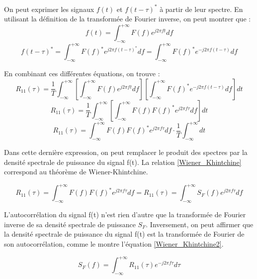 	On peut exprimer les signaux $f(t)$ et $f(t-\tau)^{*}$ à partir de leur spectre. En utilisant la définition de la transformée de Fourier inverse, on peut montrer que : 
	\begin{equation*}
	f(t)=\int_{-\infty}^{+\infty}F(f)e^{j2\pi ft}df
	\end{equation*}
	\begin{equation*}
	f(t-\tau)^{*}=\int_{-\infty}^{+\infty}F(f)^{*}e^{j2\pi f(t-\tau)^{*}}df=\int_{-\infty}^{+\infty}F(f)^{*}e^{-j2\pi f(t-\tau)}df
	\end{equation*}
	
	En combinant ces différentes équations, on trouve : 
	\begin{equation*}
	R_{11}(\tau)=\frac{1}{T}\int_{-\infty}^{+\infty}[\int_{-\infty}^{+\infty}F(f)e^{j2\pi ft}df][\int_{-\infty}^{+\infty}F(f)^{*}e^{-j2\pi f(t-\tau)}df]dt
	\end{equation*}
	\begin{equation*}
	R_{11}(\tau)=\frac{1}{T}\int_{-\infty}^{+\infty}[\int_{-\infty}^{+\infty}F(f)F(f)^{*}e^{j2\pi f\tau}df]dt
	\end{equation*}
	\begin{equation*}
	R_{11}(\tau)=\int_{-\infty}^{+\infty}F(f)F(f)^{*}e^{j2\pi f\tau}df \cdot \frac{1}{T}\int_{-\infty}^{+\infty}dt
	\end{equation*}
	
	Dans cette dernière expression, on peut remplacer le produit des spectres par la densité spectrale de puissance du signal f(t). La relation \ref{Wiener_Khintchine} correspond au théorème de Wiener-Khintchine.
	
	\begin{equation}\label{Wiener_Khintchine}
		R_{11}(\tau)=\int_{-\infty}^{+\infty}F(f)F(f)^{*}e^{j2\pi f\tau}df=	R_{11}(\tau)=\int_{-\infty}^{+\infty}S_{F}(f)e^{j2\pi f\tau}df
	\end{equation}
	
	L'autocorrélation du signal f(t) n'est rien d'autre que la transformée de Fourier inverse de sa densité spectrale de puissance $S_{F}$. Inversement, on peut affirmer que la densité spectrale de puissance du signal f(t) est la transformée de Fourier de son autocorrélation, comme le montre l'équation \ref{Wiener_Khintchine2}.
	
	\begin{equation}\label{Wiener_Khintchine2}
	S_{F}(f)=	\int_{-\infty}^{+\infty}R_{11}(\tau)e^{-j2\pi f\tau}d\tau
	\end{equation}
	
